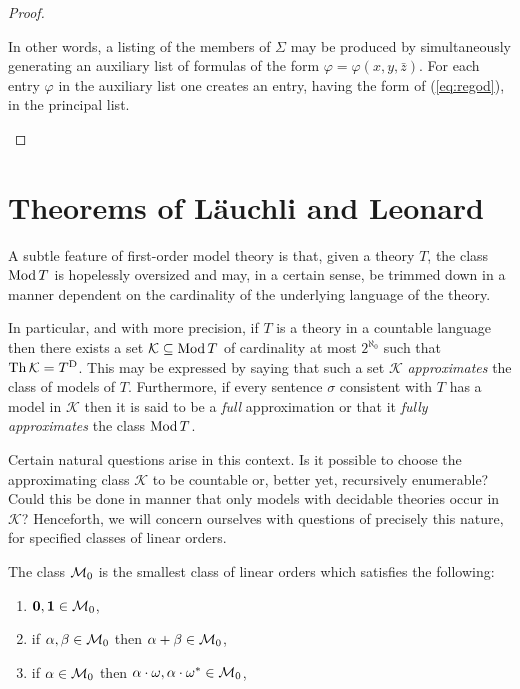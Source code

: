 \begin{prp}
\begin{proof}
\begin{enumerate}
				In other words, a listing of the members of $\Sigma$ may be
				produced by simultaneously generating an auxiliary list of
				formulas of the form $\varphi=\varphi(x,y,\bar{z})$.  For each
				entry $\varphi$ in the auxiliary list one creates an entry,
				having the form of (\ref{eq:regod}), in the principal
				list.\qedhere
		\end{enumerate}
	\end{proof}
\end{prp}


\section{Theorems of L\"auchli and Leonard}

A subtle feature of first-order model theory is that, given a theory $T$, the
class $\operatorname{Mod} T$ is hopelessly oversized and may, in a certain sense, be trimmed
down in a manner dependent on the cardinality of the underlying language of the
theory.

In particular, and with more precision, if $T$ is a theory in a countable
language then there exists a set $\mathcal{K}\subseteq\operatorname{Mod} T$ of cardinality at
most $2^{\aleph_0}$ such that $\operatorname{Th}\mathcal{K}={T}^\mathrm{D}$.  This may be expressed
by saying that such a set $\mathcal{K}$ \textit{approximates} the class of
models of $T$.  Furthermore, if every sentence $\sigma$ consistent with $T$ has
a model in $\mathcal{K}$ then it is said to be a \textit{full} approximation or
that it \textit{fully approximates} the class $\operatorname{Mod} T$.

Certain natural questions arise in this context.  Is it possible to choose the
approximating class $\mathcal{K}$ to be countable or, better yet, recursively
enumerable?  Could this be done in manner that only models with decidable
theories occur in $\mathcal{K}$?  Henceforth, we will concern ourselves with
questions of precisely this nature, for specified classes of linear orders.

\begin{dfn}
	The class $\mathcal{M}_0$ is the smallest class of linear orders which satisfies the following:
	\begin{enumerate}
		\item	$\mathbf{0},\mathbf{1}\in\mathcal{M}_0$,
		\item	if $\alpha,\beta\in\mathcal{M}_0$ then $\alpha+\beta\in\mathcal{M}_0$,
		\item	if $\alpha\in\mathcal{M}_0$ then $\alpha\cdot\omega,\alpha\cdot{\omega}^\ast\in\mathcal{M}_0$,
	\end{enumerate}
\end{dfn}

